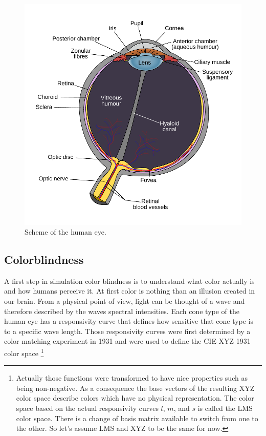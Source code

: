 \documentclass{sig-alternate-05-2015}
\begin{document}
\begin{figure}
    \centering
    \includegraphics[width=\columnwidth]{human_eye_scheme.pdf}
    \caption{Scheme of the human eye.}
    \label{fig:humaneye}
\end{figure}
%
%
\subsection{Colorblindness}
A first step in simulation color blindness is to understand what color actually is and how humans perceive it.
At first color is nothing than an illusion created in our brain.
From a physical point of view, light can be thought of a wave and therefore described by the waves spectral intensities.
Each cone type of the human eye has a responsivity curve that defines how sensitive that cone type is to a specific wave length.
Those responsivity curves were first determined by a color matching experiment in 1931 and were used to define the CIE XYZ 1931 color space
\footnote{
    Actually those functions were transformed to have nice properties such as being non-negative.
    As a consequence the base vectors of the resulting XYZ color space describe colors which have no physical representation.
    The color space based on the actual responsivity curves $l$, $m$, and $s$ is called the LMS color space.
    There is a change of basis matrix available to switch from one to the other.
    So let's assume LMS and XYZ to be the same for now.
}
\end{document}
